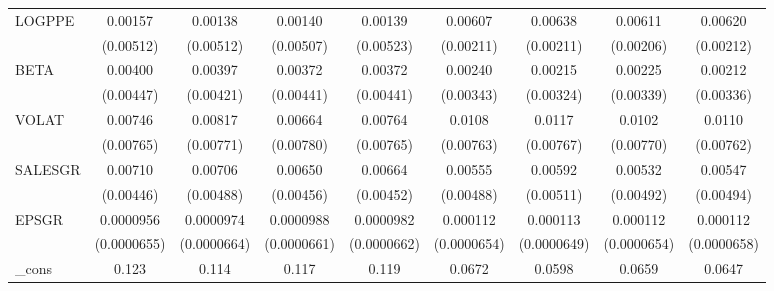 \begin{table}[htbp]
\begin{tabular}{l*{8}{c}}
LOGPPE              &     0.00157         &     0.00138         &     0.00140         &     0.00139         &     0.00607\sym{***}&     0.00638\sym{***}&     0.00611\sym{***}&     0.00620\sym{***}\\
                    &   (0.00512)         &   (0.00512)         &   (0.00507)         &   (0.00523)         &   (0.00211)         &   (0.00211)         &   (0.00206)         &   (0.00212)         \\
BETA                &     0.00400         &     0.00397         &     0.00372         &     0.00372         &     0.00240         &     0.00215         &     0.00225         &     0.00212         \\
                    &   (0.00447)         &   (0.00421)         &   (0.00441)         &   (0.00441)         &   (0.00343)         &   (0.00324)         &   (0.00339)         &   (0.00336)         \\
VOLAT               &     0.00746         &     0.00817         &     0.00664         &     0.00764         &      0.0108         &      0.0117         &      0.0102         &      0.0110         \\
                    &   (0.00765)         &   (0.00771)         &   (0.00780)         &   (0.00765)         &   (0.00763)         &   (0.00767)         &   (0.00770)         &   (0.00762)         \\
SALESGR             &     0.00710         &     0.00706         &     0.00650         &     0.00664         &     0.00555         &     0.00592         &     0.00532         &     0.00547         \\
                    &   (0.00446)         &   (0.00488)         &   (0.00456)         &   (0.00452)         &   (0.00488)         &   (0.00511)         &   (0.00492)         &   (0.00494)         \\
EPSGR               &   0.0000956         &   0.0000974         &   0.0000988         &   0.0000982         &    0.000112\sym{*}  &    0.000113\sym{*}  &    0.000112\sym{*}  &    0.000112\sym{*}  \\
                    & (0.0000655)         & (0.0000664)         & (0.0000661)         & (0.0000662)         & (0.0000654)         & (0.0000649)         & (0.0000654)         & (0.0000658)         \\
\_cons              &       0.123\sym{**} &       0.114\sym{**} &       0.117\sym{**} &       0.119\sym{**} &      0.0672\sym{**} &      0.0598\sym{*}  &      0.0659\sym{**} &      0.0647\sym{**} \\

\end{tabular}
\end{table}
